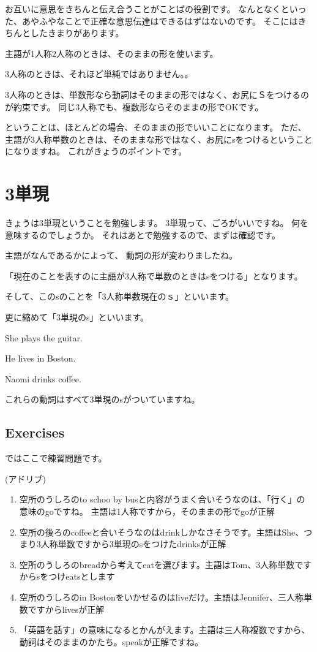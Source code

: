 \documentclass[book,jafontscale=0.9247]{jlreq}
\begin{document}
お互いに意思をきちんと伝え合うことがことばの役割です。
なんとなくといった、あやふやなことで正確な意思伝達はできるはずはないのです。
そこにはきちんとしたきまりがあります。

主語が1人称2人称のときは、そのままの形を使います。

3人称のときは、それほど単純ではありません。。

3人称のときは、単数形なら動詞はそのままの形ではなく、お尻にＳをつけるのが約束です。
同じ3人称でも、複数形ならそのままの形でOKです。

ということは、ほとんどの場合、そのままの形でいいことになります。
ただ、主語が3人称単数のときは、そのままな形ではなく、お尻にsをつけるということになりますね。
これがきょうのポイントです。

\newpage
 \section{3単現}
きょうは3単現ということを勉強します。
3単現って、ごろがいいですね。
何を意味するのでしょうか。
それはあとで勉強するので、まずは確認です。

主語がなんであるかによって、
動詞の形が変わりましたね。

「現在のことを表すのに主語が3人称で単数のときはsをつける」となります。



そして、このsのことを「3人称単数現在のｓ」といいます。

更に縮めて「3単現のs」といいます。

She plays the guitar.

He lives in Boston.

Naomi drinks coffee.

これらの動詞はすべて3単現のsがついていますね。

\subsection{Exercises}


ではここで練習問題です。

(アドリブ)


\begin{enumerate}
 \item 空所のうしろのto schoo by busと内容がうまく合いそうなのは、「行く」の意味のgoですね。
主語は1人称ですから，そのままの形でgoが正解
 \item 空所の後ろのcoffeeと合いそうなのはdrinkしかなさそうです。主語はShe、つまり3人称単数ですから3単現のsをつけたdrinksが正解
 \item 空所のうしろのbreadから考えてeatを選びます。主語はTom、3人称単数ですからsをつけeatsとします
 \item 空所のうしろのin Bostonをいかせるのはliveだけ。主語はJennifer、三人称単数ですからlivesが正解
 \item 「英語を話す」の意味になるとかんがえます。主語は三人称複数ですから、動詞はそのままのかたち。speakが正解ですね。
\end{enumerate}
\end{document}
